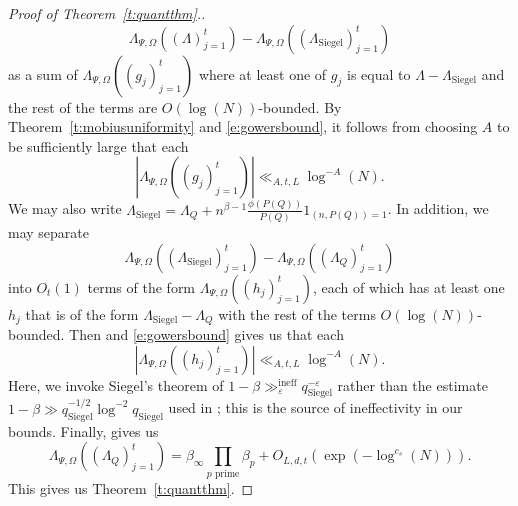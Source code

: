 \documentclass[11pt, a4paper]{amsart}
\theoremstyle{plain}
\theoremstyle{plain}
\theoremstyle{definition}
\theoremstyle{remark}
\numberwithin{equation}{section}
\numberwithin{lemma}{section}
\numberwithin{proposition}{section}
\numberwithin{corollary}{section}
\numberwithin{definition}{section}
\numberwithin{claim}{section}
\begin{document}
\begin{proof}[Proof of Theorem~\ref{t:quantthm}.]
$$\Lambda_{\Psi, \Omega}((\Lambda)_{j = 1}^t) - \Lambda_{\Psi, \Omega}((\Lambda_{\mathrm{Siegel}})_{j = 1}^t)$$
as a sum of $\Lambda_{\Psi, \Omega}((g_j)_{j = 1}^t)$ where at least one of $g_j$ is equal to $\Lambda - \Lambda_{\mathrm{Siegel}}$ and the rest of the terms are $O(\log(N))$-bounded. By Theorem~\ref{t:mobiusuniformity} and \eqref{e:gowersbound}, it follows from choosing $A$ to be sufficiently large that each
$$|\Lambda_{\Psi, \Omega}((g_j)_{j = 1}^t)| \ll_{A, t,L} \log^{-A}(N).$$
We may also write $\Lambda_{\mathrm{Siegel}} = \Lambda_Q + n^{\beta - 1}\frac{\phi(P(Q))}{P(Q)} 1_{(n, P(Q)) = 1}$. In addition, we may separate 
$$\Lambda_{\Psi, \Omega}((\Lambda_{\mathrm{Siegel}})_{j = 1}^t) - \Lambda_{\Psi, \Omega}((\Lambda_Q)_{j = 1}^t)$$
into $O_t(1)$ terms of the form $\Lambda_{\Psi, \Omega}((h_j)_{j = 1}^t)$, each of which has at least one $h_j$ that is of the form $\Lambda_{\mathrm{Siegel}} - \Lambda_Q$ with the rest of the terms $O(\log(N))$-bounded. Then \cite[Theorem 2.5]{TT21} and \eqref{e:gowersbound} gives us that each
$$|\Lambda_{\Psi, \Omega}((h_j)_{j = 1}^t)| \ll_{A, t, L} \log^{-A}(N).$$
Here, we invoke Siegel's theorem of $1 - \beta \gg_\varepsilon^{\mathrm{ineff}} q_{\mathrm{Siegel}}^{-\varepsilon}$ rather than the estimate $1 - \beta \gg q_{\mathrm{Siegel}}^{-1/2}\log^{-2}q_{\mathrm{Siegel}}$ used in \cite{TT21}; this is the source of ineffectivity in our bounds. Finally, \cite[Proposition 5.2]{TT21} gives us
$$\Lambda_{\Psi, \Omega}((\Lambda_Q)_{j = 1}^t) = \beta_\infty \prod_{p \text{ prime}} \beta_p + O_{L, d, t}(\exp(-\log^{c_s}(N))).$$
This gives us Theorem~\ref{t:quantthm}.
\end{proof}




\appendix
\end{document}
